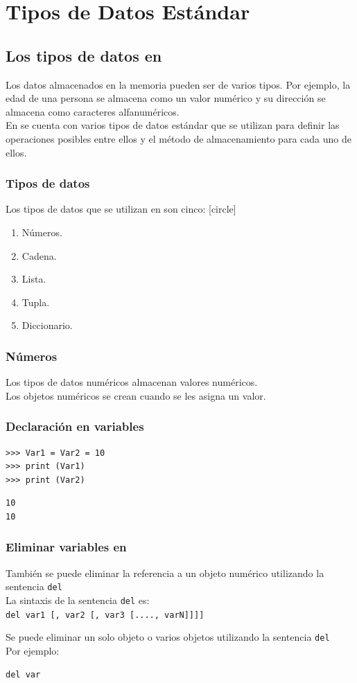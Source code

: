 {\section{Tipos de Datos Estándar}
\subsection{Los tipos de datos en \python}
\begin{frame}
Los datos almacenados en la memoria pueden ser de varios tipos. Por ejemplo, la edad de una persona se almacena como un valor numérico y su dirección se almacena como caracteres alfanuméricos.
\\
\bigskip
En \python se cuenta con varios tipos de datos estándar que se utilizan para definir las operaciones posibles entre ellos y el método de almacenamiento para cada uno de ellos.
\end{frame}
\begin{frame}
\frametitle{Tipos de datos}
Los tipos de datos que se utilizan en \python son cinco:
[circle]
\begin{enumerate}[<+->]
\item Números.
\item Cadena.
\item Lista.
\item Tupla.
\item Diccionario.
\end{enumerate}
\end{frame}
\begin{frame}
\frametitle{Números}
Los tipos de datos numéricos almacenan valores numéricos.
\\
\bigskip
Los objetos numéricos se crean cuando se les asigna un valor.
\end{frame}
\begin{frame}[fragile]
\frametitle{Declaración en variables}
\begin{verbatim}
>>> Var1 = Var2 = 10
>>> print (Var1)
>>> print (Var2)
\end{verbatim}
\pause
\begin{verbatim}
10
10
\end{verbatim}
\end{frame}
\begin{frame}
\frametitle{Eliminar variables en \python}
También se puede eliminar la referencia a un objeto numérico utilizando la sentencia \texttt{del}
\\
\bigskip
La sintaxis de la sentencia \texttt{del} es:
\\
\bigskip
\texttt{del var1 [, var2 [, var3 [...., varN]]]]}
\end{frame}
\begin{frame}[fragile]
Se puede eliminar un solo objeto o varios objetos utilizando la sentencia \texttt{del}
\\
\bigskip
Por ejemplo:
\begin{verbatim}
del var


\end{verbatim}
\end{frame}}
